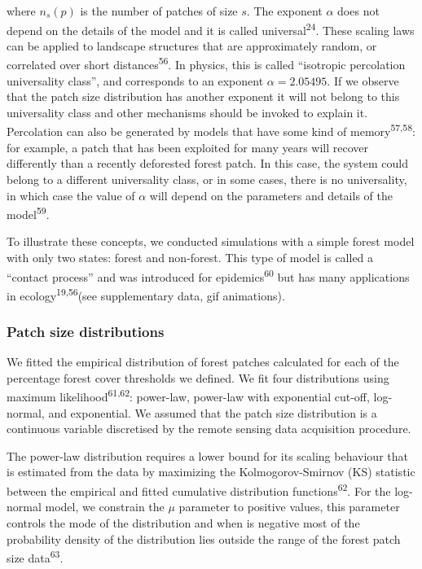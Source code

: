 \documentclass[]{article}
\begin{document}
where \(n_s(p)\) is the number of patches of size \(s\). The exponent
\(\alpha\) does not depend on the details of the model and it is called
universal\textsuperscript{24}. These scaling laws can be applied to
landscape structures that are approximately random, or correlated over
short distances\textsuperscript{56}. In physics, this is called
``isotropic percolation universality class'', and corresponds to an
exponent \(\alpha=2.05495\). If we observe that the patch size
distribution has another exponent it will not belong to this
universality class and other mechanisms should be invoked to explain it.
Percolation can also be generated by models that have some kind of
memory\textsuperscript{57,58}: for example, a patch that has been
exploited for many years will recover differently than a recently
deforested forest patch. In this case, the system could belong to a
different universality class, or in some cases, there is no
universality, in which case the value of \(\alpha\) will depend on the
parameters and details of the model\textsuperscript{59}.

To illustrate these concepts, we conducted simulations with a simple
forest model with only two states: forest and non-forest. This type of
model is called a ``contact process'' and was introduced for
epidemics\textsuperscript{60} but has many applications in
ecology\textsuperscript{19,56}(see supplementary data, gif animations).

\subsubsection{Patch size distributions}\label{patch-size-distributions}

We fitted the empirical distribution of forest patches calculated for
each of the percentage forest cover thresholds we defined. We fit four
distributions using maximum likelihood\textsuperscript{61,62}:
power-law, power-law with exponential cut-off, log-normal, and
exponential. We assumed that the patch size distribution is a continuous
variable discretised by the remote sensing data acquisition procedure.

The power-law distribution requires a lower bound for its scaling
behaviour that is estimated from the data by maximizing the
Kolmogorov-Smirnov (KS) statistic between the empirical and fitted
cumulative distribution functions\textsuperscript{62}. For the
log-normal model, we constrain the \(\mu\) parameter to positive values,
this parameter controls the mode of the distribution and when is
negative most of the probability density of the distribution lies
outside the range of the forest patch size data\textsuperscript{63}.
\end{document}
